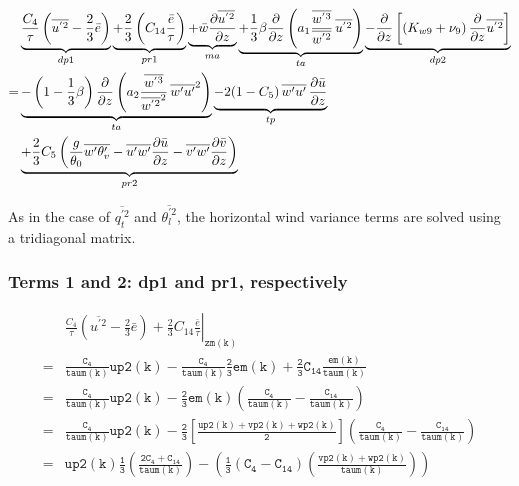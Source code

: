 \documentclass[11pt,fleqn]{article}
\newcommand{\ptlder}[2]{\frac{\partial #1}{\partial #2}}
\begin{document}
\begin{equation}
\begin{split}
\label{eq_up2_ss}
& \underbrace{
  \dfrac{C_4}{\tau} 
  \left(
    \overline{u^{'2}} - \frac{2}{3} \bar{e}
  \right)}_{dp1}
  \underbrace{
   + \frac{2}{3} 
     \left( 
        C_{14} \frac{\bar{e}}{\tau} 
     \right)}_{pr1}
  \underbrace{ 
+ \bar{w}\ptlder{\overline{u^{'2}}}{z} }_{ma}
  \underbrace{
+ \frac{1}{3} \beta
   \ptlder{}{z}
     \left( 
       a_1
       \frac{\overline{w^{'3}}}{\overline{w^{'2}}} \,
       \overline{u^{'2}}
     \right) }_{ta}
  \underbrace{
- \ptlder{}{z} \left[ \left( K_{w9} + \nu_9 \right)
                      \ptlder{}{z} \overline{u^{'2}}
               \right] }_{dp2}  \\
=&   \underbrace{
   - \left( 1 - \frac{1}{3}\beta \right)
       \ptlder{}{z}
         \left( 
           a_2
           \frac{\overline{w^{'3}}}{\overline{w^{'2}}^2} \,
           \overline{w'u'}^2
         \right) }_{ta}
     \underbrace{
   - 2 (1 - C_{5} ) \, \overline{w'u'} \, \ptlder{\bar{u}}{z} }_{tp} \\
 &   \underbrace{
   + \frac{2}{3} C_5
     \left(
       \frac{g}{\theta_0} \overline{w'\theta'_v} 
       - \overline{u'w'}\ptlder{\bar{u}}{z} 
       - \overline{v'w'}\ptlder{\bar{v}}{z} 
     \right) }_{pr2}
\end{split}
\end{equation}

As in the case of $\overline{q_t^{'2}}$ and $\overline{\theta_l^{'2}}$, the 
horizontal wind variance terms are solved using a tridiagonal matrix.

\subsubsection{Terms 1 and 2:  dp1 and pr1, respectively}
%
\begin{equation}
\begin{split}
 & \left. \frac{C_4}{\tau} 
    \left(
      \overline{u^{'2}} - \frac{2}{3} \bar{e}
    \right) 
   + \frac{2}{3} C_{14} \frac{\bar{e}}{\tau} \right|_{\mathtt{zm(k)}} \\
=& \mathtt{
   \frac{C_4}{taum(k)} up2(k)
   -\frac{C_4}{taum(k)} \frac{2}{3} em(k)
   + \frac{2}{3} C_{14} \frac{em(k)}{taum(k)}
    } \\
=& \mathtt{
   \frac{C_4}{taum(k)} up2(k) - \frac{2}{3} em(k) 
   \left( 
     \frac{C_4}{taum(k)} - \frac{C_{14}}{taum(k)}
   \right) 
   } \\
=& \mathtt{
   \frac{C_4}{taum(k)} up2(k) - \frac{2}{3}
   \left[
     \frac{up2(k) + vp2(k) + wp2(k)}{2}
   \right]
   \left( 
     \frac{C_4}{taum(k)} - \frac{C_{14}}{taum(k)}
   \right) 
   } \\
=& \mathtt{
   up2(k) 
   \frac{1}{3} \left(
      \frac{2 C_4 + C_{14}}{taum(k)}
   \right)
 - \left( 
     \frac{1}{3} 
     \left(
        C_4 - C_{14}
     \right)
     \left(
        \frac{vp2(k) + wp2(k)}{taum(k)}
     \right)
   \right) 
   }
\end{split}
\end{equation}
%
\end{document}
